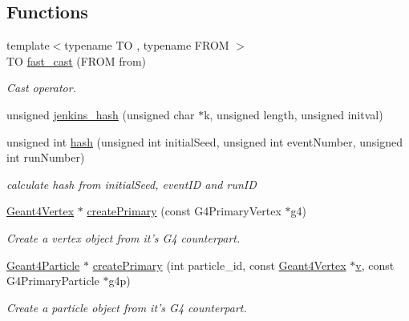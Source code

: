 \subsection*{Functions}
\begin{DoxyCompactItemize}
\item 
{\footnotesize template$<$typename TO , typename FROM $>$ }\\TO \hyperlink{namespace_d_d4hep_1_1_simulation_afaa8ce4967787e772f2a1e503ca81929}{fast\_\-cast} (FROM from)
\begin{DoxyCompactList}\small\item\em Cast operator. \item\end{DoxyCompactList}\item 
unsigned \hyperlink{namespace_d_d4hep_1_1_simulation_a7a70f98f660222ddbf5b8dea8ffd1bb6}{jenkins\_\-hash} (unsigned char $\ast$k, unsigned length, unsigned initval)
\item 
unsigned int \hyperlink{namespace_d_d4hep_1_1_simulation_ae0f666f5766acb8613abdf7257606965}{hash} (unsigned int initialSeed, unsigned int eventNumber, unsigned int runNumber)
\begin{DoxyCompactList}\small\item\em calculate hash from initialSeed, eventID and runID \item\end{DoxyCompactList}\item 
\hyperlink{class_d_d4hep_1_1_simulation_1_1_geant4_vertex}{Geant4Vertex} $\ast$ \hyperlink{namespace_d_d4hep_1_1_simulation_ab6d15d53b34ea70681d56870814d48b2}{createPrimary} (const G4PrimaryVertex $\ast$g4)
\begin{DoxyCompactList}\small\item\em Create a vertex object from it's G4 counterpart. \item\end{DoxyCompactList}\item 
\hyperlink{class_d_d4hep_1_1_simulation_1_1_geant4_particle}{Geant4Particle} $\ast$ \hyperlink{namespace_d_d4hep_1_1_simulation_a4ba463edde87d20831a604346d29a129}{createPrimary} (int particle\_\-id, const \hyperlink{class_d_d4hep_1_1_simulation_1_1_geant4_vertex}{Geant4Vertex} $\ast$\hyperlink{_multi_view_8cpp_a8320ee13ac034dbf6d624fe8953dd337}{v}, const G4PrimaryParticle $\ast$g4p)
\begin{DoxyCompactList}\small\item\em Create a particle object from it's G4 counterpart. \item\end{DoxyCompactList}\item 

\end{DoxyCompactItemize}

